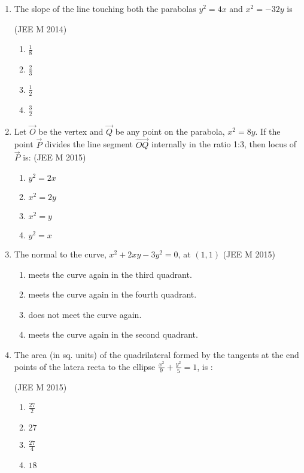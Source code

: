 \documentclass[journal,12pt,twocolumn]{IEEEtran}
\theoremstyle{remark}
\begin{document}
\begin{enumerate}[label=\arabic*.]
    \item The slope of the line touching both the parabolas $y^2=4x$ and $x^2=-32y$ is

    \hfill(JEE M 2014)
    \begin{enumerate}[label=(\alph*)]
    \item$\frac{1}{8}$
    \item$\frac{2}{3}$
    \item$\frac{1}{2}$
    \item$\frac{3}{2}$ \\
    \end{enumerate}

    \item Let $\vec{O}$ be the vertex and $\vec{Q}$ be any point on the parabola, $x^2=8y$. If the point $\vec{P}$ divides the line segment $\vec{OQ}$ internally in the ratio 1:3, then locus of $\vec{P}$ is:
    \hfill(JEE M 2015)
    \begin{enumerate}[label=(\alph*)]
    \item$y^2=2x$
    \item$x^2=2y$
    \item$x^2=y$
    \item$y^2=x$ \\
    \end{enumerate}

    \item The normal to the curve, $x^2+2xy-3y^2=0$, at $(1,1)$
    \hfill(JEE M 2015)
    \begin{enumerate}[label=(\alph*)]
    \item meets the curve again in the third quadrant.
    \item meets the curve again in the fourth quadrant.
    \item does not meet the curve again.
    \item meets the curve again in the second quadrant.\\
    \end{enumerate}
    \item The area (in sq. units) of the quadrilateral formed by the tangents at the end points of the latera recta to the ellipse $\frac{x^2}{9}+\frac{y^2}{5}=1$, is :
    
    \hfill(JEE M 2015)
    \begin{enumerate}[label=(\alph*)]
    \item$\frac{27}{2}$
    \item$27$
    \item$\frac{27}{4}$
    \item$18$ \\
    \end{enumerate}


\end{enumerate}
\end{document}
